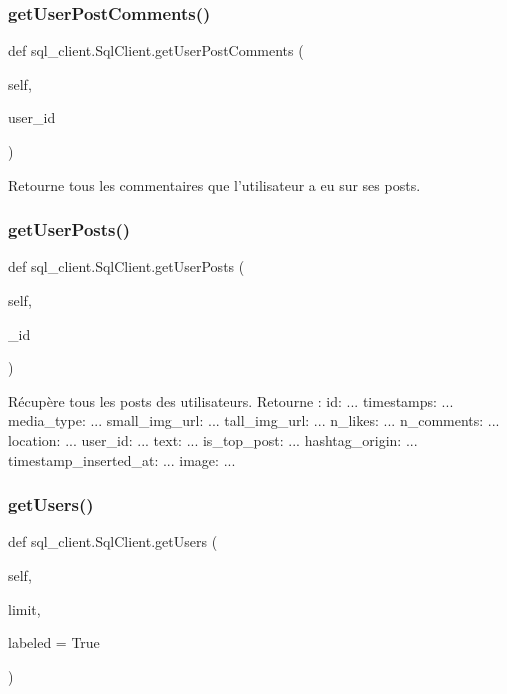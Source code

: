 \subsubsection{\texorpdfstring{get\+User\+Post\+Comments()}{getUserPostComments()}}
{\footnotesize\ttfamily def sql\+\_\+client.\+Sql\+Client.\+get\+User\+Post\+Comments (\begin{DoxyParamCaption}\item[{}]{self,  }\item[{}]{user\+\_\+id }\end{DoxyParamCaption})}

\begin{DoxyVerb}Retourne tous les commentaires que l'utilisateur a eu sur ses posts.
\end{DoxyVerb}
 \mbox{\label{classsql__client_1_1_sql_client_ae5bd5fba97db2686788dbd05cca758c4}} 
\subsubsection{\texorpdfstring{get\+User\+Posts()}{getUserPosts()}}
{\footnotesize\ttfamily def sql\+\_\+client.\+Sql\+Client.\+get\+User\+Posts (\begin{DoxyParamCaption}\item[{}]{self,  }\item[{}]{\+\_\+id }\end{DoxyParamCaption})}

\begin{DoxyVerb}Récupère tous les posts des utilisateurs.
Retourne : {
    id: ...
    timestamps: ...
    media_type: ...
    small_img_url: ...
    tall_img_url: ...
    n_likes: ...
    n_comments: ...
    location: ...
    user_id: ...
    text: ...
    is_top_post: ...
    hashtag_origin: ...
    timestamp_inserted_at: ...
    image: ...
}
\end{DoxyVerb}
 \mbox{\label{classsql__client_1_1_sql_client_a40842f3f655d0256a1accdec40e731b4}} 
\subsubsection{\texorpdfstring{get\+Users()}{getUsers()}}
{\footnotesize\ttfamily def sql\+\_\+client.\+Sql\+Client.\+get\+Users (\begin{DoxyParamCaption}\item[{}]{self,  }\item[{}]{limit,  }\item[{}]{labeled = {\ttfamily True} }\end{DoxyParamCaption})}

